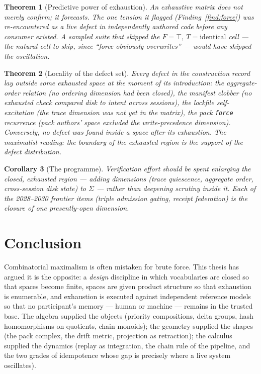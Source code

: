 \documentclass[11pt,a4paper]{report}
\newtheorem{theorem}{Theorem}[chapter]
\newtheorem{corollary}[theorem]{Corollary}
\theoremstyle{definition}
\theoremstyle{remark}
\newcommand{\Sig}{\Sigma}
\begin{document}
\begin{theorem}[Predictive power of exhaustion]\label{thm:predict}
An exhaustive matrix does not merely confirm; it \emph{forecasts}. The one
tension it flagged (Finding~\ref{find:force}) was re-encountered as a live
defect in independently authored code before any consumer existed. A sampled
suite that skipped the $F=\top,\ T=\mathrm{identical}$ cell --- the natural
cell to skip, since ``force obviously overwrites'' --- would have shipped the
oscillation.
\end{theorem}

\begin{theorem}[Locality of the defect set]\label{thm:local}
Every defect in the construction record lay outside some exhausted space at
the moment of its introduction: the aggregate-order relation (no ordering
dimension had been closed), the manifest clobber (no exhausted check compared
disk to intent across sessions), the lockfile self-excitation (the trace
dimension was not yet in the matrix), the pack \texttt{force} recurrence
(pack authors' space excluded the write-precedence dimension). Conversely,
no defect was found \emph{inside} a space after its exhaustion. The
maximalist reading: the boundary of the exhausted region is the support of
the defect distribution.
\end{theorem}

\begin{corollary}[The programme]
Verification effort should be spent enlarging the closed, exhausted region
--- adding dimensions (trace quiescence, aggregate order, cross-session disk
state) to $\Sig$ --- rather than deepening scrutiny inside it. Each of the
2028--2030 frontier items (triple admission gating, receipt federation) is
the closure of one presently-open dimension.
\end{corollary}

\chapter{Conclusion}

Combinatorial maximalism is often mistaken for brute force. This thesis has
argued it is the opposite: a \emph{design} discipline in which vocabularies
are closed so that spaces become finite, spaces are given product structure
so that exhaustion is enumerable, and exhaustion is executed against
independent reference models so that no participant's memory --- human or
machine --- remains in the trusted base. The algebra supplied the objects
(priority compositions, delta groups, hash homomorphisms on quotients,
chain monoids); the geometry supplied the shapes (the pack complex, the
drift metric, projection as retraction); the calculus supplied the dynamics
(replay as integration, the chain rule of the pipeline, and the two grades
of idempotence whose gap is precisely where a live system oscillates).
\end{document}
